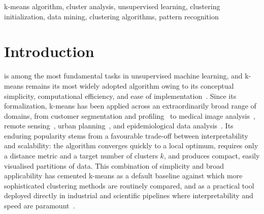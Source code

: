 \begin{IEEEkeywords}
k-means algorithm, cluster analysis, unsupervised learning, clustering initialization, data mining, clustering algorithms, pattern recognition
\end{IEEEkeywords}

\section{Introduction}\label{sec:intro}
 is among the most fundamental tasks in unsupervised machine learning, and k-means remains its most widely adopted algorithm owing to its conceptual simplicity, computational efficiency, and ease of implementation~\cite{sinaga2020unsupervised,chong2021means}. Since its formalization, k-means has been applied across an extraordinarily broad range of domains, from customer segmentation and profiling~\cite{syakur2018integration,tabianan2022means} to medical image analysis~\cite{alam2019automatic}, remote sensing~\cite{kazakhstan2019multi}, urban planning~\cite{ran2021novel}, and epidemiological data analysis~\cite{indraputra2020means}. Its enduring popularity stems from a favourable trade-off between interpretability and scalability: the algorithm converges quickly to a local optimum, requires only a distance metric and a target number of clusters $k$, and produces compact, easily visualised partitions of data. This combination of simplicity and broad applicability has cemented k-means as a default baseline against which more sophisticated clustering methods are routinely compared, and as a practical tool deployed directly in industrial and scientific pipelines where interpretability and speed are paramount~\cite{dhanachandra2015image,sattarov2023unveiling}.

